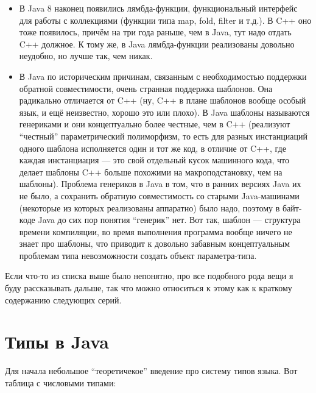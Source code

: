 \documentclass[a5paper]{article}
\begin{document}
\begin{itemize}
	\item В Java 8 наконец появились лямбда-функции, функциональный интерфейс для работы с коллекциями (функции типа map, fold, filter и т.д.). В C++ оно тоже появилось, причём на три года раньше, чем в Java, тут надо отдать C++ должное. К тому же, в Java лямбда-функции реализованы довольно неудобно, но лучше так, чем никак.
	\item В Java по историческим причинам, связанным с необходимостью поддержки обратной совместимости, очень странная поддержка шаблонов. Она радикально отличается от C++ (ну, C++ в плане шаблонов вообще особый язык, и ещё неизвестно, хорошо это или плохо). В Java шаблоны называются генериками и они концептуально более честные, чем в C++ (реализуют ``честный'' параметрический полиморфизм, то есть для разных инстанциаций одного шаблона исполняется один и тот же код, в отличие от C++, где каждая инстанциация --- это свой отдельный кусок машинного кода, что делает шаблоны C++ больше похожими на макроподстановку, чем на шаблоны). Проблема генериков в Java в том, что в ранних версиях Java их не было, а сохранить обратную совместимость со старыми Java-машинами (некоторые из которых реализованы аппаратно) было надо, поэтому в байт-коде Java до сих пор понятия ``генерик'' нет. Вот так, шаблон --- структура времени компиляции, во время выполнения программа вообще ничего не знает про шаблоны, что приводит к довольно забавным концептуальным проблемам типа невозможности создать объект параметра-типа.
\end{itemize}

Если что-то из списка выше было непонятно, про все подобного рода вещи я буду рассказывать дальше, так что можно относиться к этому как к краткому содержанию следующих серий.

\section{Типы в Java}

Для начала небольшое ``теоретичекое'' введение про систему типов языка. Вот таблица с числовыми типами:
\end{document}
